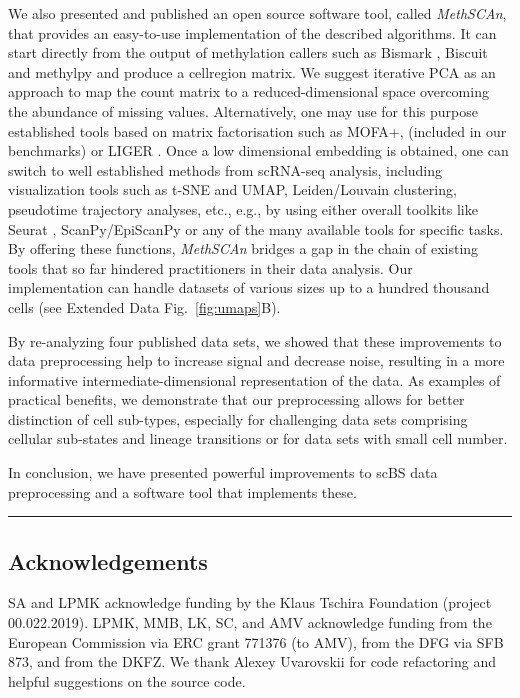 \documentclass[10pt]{article}
\begin{document}
We also presented and published an open source software tool, called \textit{MethSCAn}, that provides an easy-to-use implementation of the described algorithms.
It can start directly from the output of methylation callers such as Bismark \citep{bismark}, Biscuit \citep{biscuit} and methylpy \citep{methylpy} and produce a cell\texttimes region matrix.
We suggest iterative PCA as an approach to map the count matrix to a reduced-dimensional space overcoming the abundance of missing values.
Alternatively, one may use for this purpose established tools based on matrix factorisation such as MOFA+, \citep{argelaguet2020mofa} (included in our benchmarks) or LIGER \citep{welch2019single}.
Once a low dimensional embedding is obtained, one can switch to well established methods from scRNA-seq analysis, including visualization tools such as t-SNE and UMAP, Leiden/Louvain clustering, pseudotime trajectory analyses, etc., e.g., by using either overall toolkits like Seurat \citep{seurat5}, ScanPy/EpiScanPy \citep{Wolf_2018,danese2021episcanpy} or any of the many available tools for specific tasks.
By offering these functions, \textit{MethSCAn} bridges a gap in the chain of existing tools that so far hindered practitioners in their data analysis.
Our implementation can handle datasets of various sizes up to a hundred thousand cells (see Extended Data Fig.~\ref{fig:umaps}B).

By re-analyzing four published data sets, we showed that these improvements to data preprocessing help to increase signal and decrease noise, resulting in a more informative intermediate-dimensional representation of the data.
As examples of practical benefits, we demonstrate that our preprocessing allows for better distinction of cell sub-types, especially for challenging data sets comprising cellular sub-states and lineage transitions or for data sets with small cell number.

In conclusion, we have presented powerful improvements to scBS data preprocessing and a software tool that implements these.

\vspace{1.4ex}
\noindent\hfil\rule{.6\columnwidth}{.2pt}\hfil


\subsection*{Acknowledgements}
SA and LPMK acknowledge funding by the Klaus Tschira Foundation (project 00.022.2019).
LPMK, MMB, LK, SC, and AMV acknowledge funding from the European Commission via ERC grant 771376 (to AMV), from the DFG via SFB 873, and from the DKFZ.
We thank Alexey Uvarovskii for code refactoring and helpful suggestions on the source code.
\end{document}
